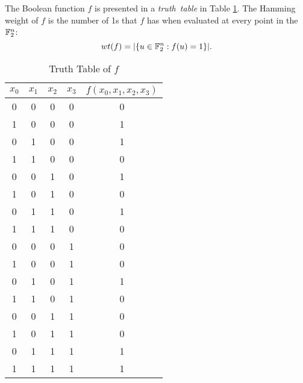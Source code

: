 \par The Boolean function $f$ is presented in a {\em truth\ table} in 
Table \ref{tab:truth-table}. The Hamming weight of $f$ is the number of 1s
that $f$ has when evaluated at every point in the $\mathbb{F}_2^n$: 
\[
wt(f)=\lvert\{u\in\mathbb{F}_2^n:f(u)=1\}\rvert.
\]
\begin{table}
\label{tab:truth-table}
	\centering
  \begin{tabular}{|c|c|c|c||c|}
    \hline
    $x_0$&$x_1$&$x_2$&$x_3$&$f(x_0,x_1,x_2,x_3)$\\
    \hline
    0&0&0&0&0\\
    1&0&0&0&1\\
    0&1&0&0&1\\
    1&1&0&0&0\\
    0&0&1&0&1\\
    1&0&1&0&0\\
    0&1&1&0&1\\
    1&1&1&0&0\\
    0&0&0&1&0\\
    1&0&0&1&0\\
    0&1&0&1&1\\
    1&1&0&1&0\\
    0&0&1&1&0\\
    1&0&1&1&0\\
    0&1&1&1&1\\
    1&1&1&1&1\\
  	\hline
	\end{tabular}
	\caption{Truth Table of $f$}
\end{table}

